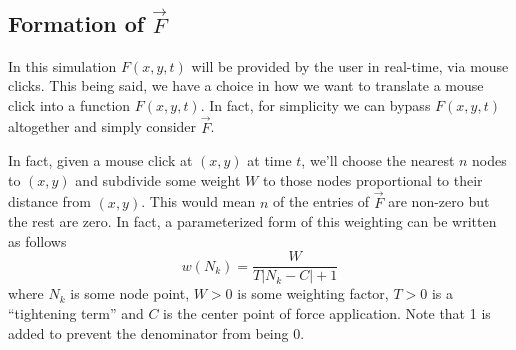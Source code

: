 \subsection{Formation of $\vec{F}$}
In this simulation $F(x,y,t)$ will be provided by the user in real-time, via mouse clicks. This being said, we have a
choice in how we want to translate a mouse click into a function $F(x,y,t)$. In fact, for simplicity we can bypass
$F(x,y,t)$ altogether and simply consider $\vec{F}$.

In fact, given a mouse click at $(x,y)$ at time $t$, we'll choose the nearest $n$ nodes to $(x,y)$ and subdivide some 
weight $W$ to those nodes proportional to their distance from $(x,y)$. This would mean $n$ of the entries of $\vec{F}$
are non-zero but the rest are zero. In fact, a parameterized form of this weighting can be written as follows
\begin{equation}
w(N_k) = \frac{W}{T|N_k - C| + 1}
\end{equation}
where $N_k$ is some node point, $W > 0$ is some weighting factor, $T > 0$ is a ``tightening term'' and $C$ is the center
point of force application. Note that 1 is added to prevent the denominator from being 0.
